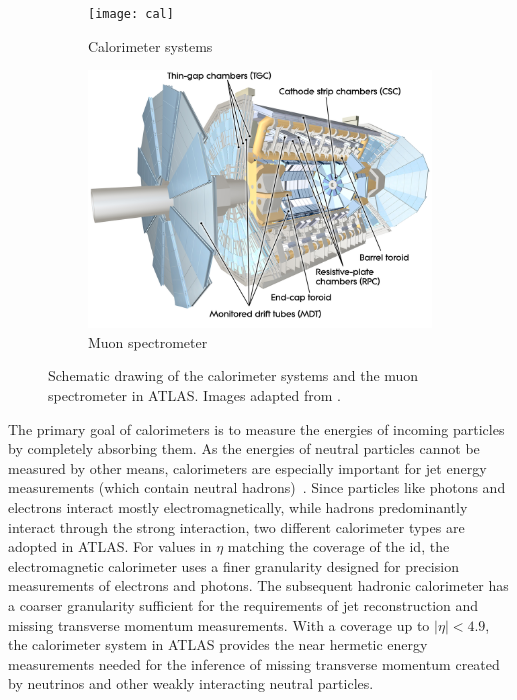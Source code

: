 \begin{figure}
	\centering
	\begin{subfigure}[b]{0.45\linewidth}
		\centering\texttt{[image: cal]}
		\caption{Calorimeter systems\label{fig:calorimeters}}
	\end{subfigure}\hfill
	\begin{subfigure}[b]{0.45\linewidth}
		\centering\includegraphics[width=\textwidth]{ms}
		\caption{Muon spectrometer\label{fig:muon_system}}
	\end{subfigure}%
	\caption{Schematic drawing of the  calorimeter systems and  the muon spectrometer in ATLAS. Images adapted from \cite{Pequenao:1095927,Pequenao:1095929}.}\label{fig:cal_ms_schematic}
\end{figure}

The primary goal of calorimeters is to measure the energies of incoming particles by completely absorbing them. As the energies of neutral particles cannot be measured by other means, calorimeters are especially important for jet energy measurements (which contain neutral hadrons)~\cite{Brock:1354959}. Since particles like photons and electrons interact mostly electromagnetically, while hadrons predominantly interact through the strong interaction, two different calorimeter types are adopted in ATLAS. For values in $\eta$ matching the coverage of the \gls{id}, the electromagnetic calorimeter uses a finer granularity designed for precision measurements of electrons and photons. The subsequent hadronic calorimeter has a coarser granularity sufficient for the requirements of jet reconstruction and missing transverse momentum measurements. With a coverage up to $\vert\eta\vert <4.9$, the calorimeter system in ATLAS provides the near hermetic energy measurements needed for the inference of missing transverse momentum created by neutrinos and other weakly interacting neutral particles.

